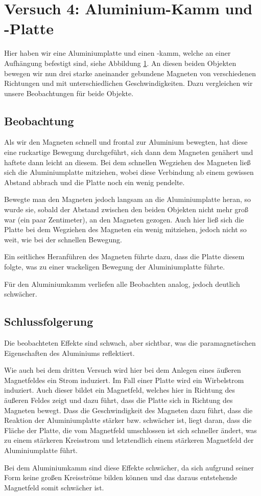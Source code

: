 \documentclass[11pt,a4paper,titlepage, ngerman]{article}
\begin{document}
	\section{Versuch 4: Aluminium-Kamm und -Platte} 
	
		Hier haben wir eine Aluminiumplatte und einen -kamm, welche an einer Aufhängung befestigt sind, siehe Abbildung \ref{}. An diesen beiden Objekten bewegen wir nun drei starke aneinander gebundene Magneten von verschiedenen Richtungen und mit unterschiedlichen Geschwindigkeiten.
		Dazu vergleichen wir unsere Beobachtungen für beide Objekte.
		
		\subsection*{Beobachtung}
		
			Als wir den Magneten schnell und frontal zur Aluminium bewegten, hat diese eine ruckartige Bewegung durchgeführt, sich dann dem Magneten genähert und haftete dann leicht an diesem. Bei dem schnellen Wegziehen des Magneten ließ sich die Aluminiumplatte mitziehen, wobei diese Verbindung ab einem gewissen Abstand abbrach und die Platte noch ein wenig pendelte. 
			
			Bewegte man den Magneten jedoch langsam an die Aluminiumplatte heran, so wurde sie, sobald der Abstand zwischen den beiden Objekten nicht mehr groß war (ein paar Zentimeter), an den Magneten gezogen. 
			Auch hier ließ sich die Platte bei dem Wegziehen des Magneten ein wenig mitziehen, jedoch nicht so weit, wie bei der schnellen Bewegung.
			
			Ein seitliches Heranführen des Magneten führte dazu, dass die Platte diesem folgte, was zu einer wackeligen Bewegung der Aluminiumplatte führte.
			
			Für den Aluminiumkamm verliefen alle Beobachten analog, jedoch deutlich schwächer.
			
		\subsection*{Schlussfolgerung}	
			
			Die beobachteten Effekte sind schwach, aber sichtbar, was die paramagnetischen Eigenschaften des Aluminiums reflektiert.
			 
			Wie auch bei dem dritten Versuch wird hier bei dem Anlegen eines äußeren Magnetfeldes ein Strom induziert.
			Im Fall einer Platte wird ein Wirbelstrom induziert. Auch dieser bildet ein Magnetfeld, welches hier in Richtung des äußeren Feldes zeigt und dazu führt, dass die Platte sich in Richtung des Magneten bewegt.
			Dass die Geschwindigkeit des Magneten dazu führt, dass die Reaktion der Aluminiumplatte stärker bzw. schwächer ist, liegt daran, dass die Fläche der Platte, die vom Magnetfeld umschlossen ist sich schneller ändert, was zu einem stärkeren Kreisstrom und letztendlich einem stärkeren Magnetfeld der Aluminiumplatte führt.
			
			Bei dem Aluminiumkamm sind diese Effekte schwächer, da sich aufgrund seiner Form keine großen Kreisströme bilden können und das daraus entstehende Magnetfeld somit schwächer ist. 
		
\end{document}
